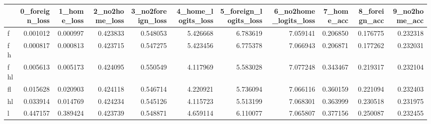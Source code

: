 \begin{tabular}{lrrrrrrrrrr}
\toprule
 & 0_foreign_loss & 1_home_loss & 2_no2home_loss & 3_no2foreign_loss & 4_home_logits_loss & 5_foreign_logits_loss & 6_no2home_logits_loss & 7_home_acc & 8_foreign_acc & 9_no2home_acc \\
\midrule
f & 0.001012 & 0.000997 & 0.423833 & 0.548053 & 5.426668 & 6.783619 & 7.059141 & 0.206850 & 0.176775 & 0.232318 \\
fh & 0.000817 & 0.000813 & 0.423715 & 0.547275 & 5.423456 & 6.775378 & 7.066943 & 0.206871 & 0.177262 & 0.232031 \\
fhl & 0.005613 & 0.005173 & 0.424095 & 0.550549 & 4.117969 & 5.583028 & 7.077248 & 0.343467 & 0.219317 & 0.232104 \\
fl & 0.015628 & 0.020903 & 0.424118 & 0.546714 & 4.220921 & 5.736094 & 7.066116 & 0.360159 & 0.221094 & 0.232403 \\
hl & 0.033914 & 0.014769 & 0.424234 & 0.545126 & 4.115723 & 5.513199 & 7.068301 & 0.363999 & 0.230518 & 0.231975 \\
l & 0.447157 & 0.389424 & 0.423739 & 0.548871 & 4.659114 & 6.110077 & 7.065807 & 0.377156 & 0.250087 & 0.232455 \\
\bottomrule
\end{tabular}
